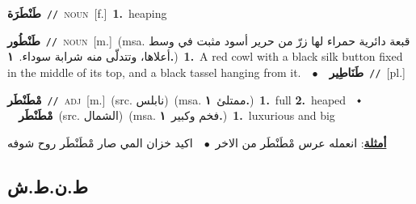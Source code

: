 \documentclass[10pt,a4paper,twoside]{article} %
\begin{document}
\begin{multicols}{2}
{\setlength\topsep{0pt}\textbf{\foreignlanguage{arabic}{طَنْطَرَة}}\ {\color{gray}\texttt{//}\color{black}}\ \textsc{noun}\ [f.]\ \textbf{1.}~heaping\ } \vspace{2mm}

{\setlength\topsep{0pt}\textbf{\foreignlanguage{arabic}{طَنْطُور}}\ {\color{gray}\texttt{//}\color{black}}\ \textsc{noun}\ [m.]\ \color{gray}(msa. \foreignlanguage{arabic}{قبعة دائرية حمراء لها زرّ من حرير أسود مثبت في وسط أعلاها، وتتدلّى منه شرابة سوداء.}~\foreignlanguage{arabic}{\textbf{١.}})\color{black}\ \textbf{1.}~A red cowl with a black silk button fixed in the middle of its top, and a black tassel hanging from it.\ \ $\bullet$\ \ \setlength\topsep{0pt}\textbf{\foreignlanguage{arabic}{طَنَاطِير}}\ {\color{gray}\texttt{//}\color{black}}\ [pl.]\ } \vspace{2mm}

{\setlength\topsep{0pt}\textbf{\foreignlanguage{arabic}{مْطَنْطَر}}\ {\color{gray}\texttt{//}\color{black}}\ \textsc{adj}\ [m.]\ (src. \color{gray}\foreignlanguage{arabic}{نابلس}\color{black})\ \color{gray}(msa. \foreignlanguage{arabic}{ممتلئ}~\foreignlanguage{arabic}{\textbf{١.}})\color{black}\ \textbf{1.}~full  \textbf{2.}~heaped\ \ $\smblkdiamond$\ \ \setlength\topsep{0pt}\textbf{\foreignlanguage{arabic}{مْطَنْطَر}}\ (src. \color{gray}\foreignlanguage{arabic}{الشمال}\color{black})\ \color{gray}(msa. \foreignlanguage{arabic}{فخم وكبير}~\foreignlanguage{arabic}{\textbf{١.}})\color{black}\ \textbf{1.}~luxurious and big\  \begin{flushright}\color{gray}\foreignlanguage{arabic}{\textbf{\underline{\foreignlanguage{arabic}{أمثلة}}}: انعمله عرس مْطَنْطَر من الاخر\ $\bullet$\ \  اكيد خزان المي صار مْطَنْطَر روح شوفه}\end{flushright}\color{black}} \vspace{2mm}

\vspace{-3mm}
\subsection*{\color{blue}\foreignlanguage{arabic}{ط.ن.ط.ش}\color{blue}{}} 


\end{multicols}
\end{document}
